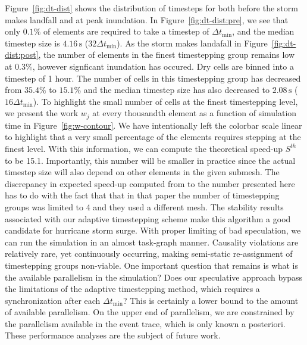  Figure~\ref{fig:dt-dist} shows the distribution of timesteps for both before the storm makes landfall and at peak inundation. In Figure~\ref{fig:dt-dist:pre}, we see that only $0.1\%$ of elements are required to take a timestep of $\Delta t_{\min}$, and the median timestep size is $4.16\,\mathrm{s}$ ($32 \Delta t_{\min}$). As the storm makes landafall in Figure~\ref{fig:dt-dist:post}, the number of elements in the finest timestepping group remains low at $0.3\%$, however signficant inundation has occured. Dry cells are binned into a timestep of 1 hour. The number of cells in this timestepping group has decreased from $35.4\%$ to $15.1\%$ and the median timestep size has also decreased to $2.08\,\mathrm{s}$ ($16 \Delta t_{\min}$). To highlight the small number of cells at the finest timestepping level, we present the work $w_j$ at every thousandth element as a function of simulation time in Figure~\ref{fig:w-contour}. We have intentionally left the colorbar scale linear to highlight that a very small percentage of the elements requires stepping at the finest level. With this information, we can compute the theoretical speed-up $S^{th}$ to be 15.1. Importantly, this number will be smaller in practice since the actual timestep size will also depend on other elements in the given submesh. The discrepancy in expected speed-up computed from \cite{Dawson2013} to the number presented here has to do with the fact that that in that paper the number of timestepping groups was limited to 4 and they used a different mesh. The stability results associated with our adaptive timestepping scheme make this algorithm a good candidate for hurricane storm surge. With proper limiting of bad speculation, we can run the simulation in an almost task-graph manner. Causality violations are relatively rare, yet continuously occurring, making semi-static re-assignment of timestepping groups non-viable. One important question that remains is what is the available parallelism in the simulation? Does our speculative approach bypass the limitations of the adaptive timestepping method, which requires a synchronization after each $\Delta t_{\min}$? This is certainly a lower bound to the amount of available parallelism. On the upper end of parallelism, we are constrained by the parallelism available in the event trace, which is only known a posteriori. These performance analyses are the subject of future work.



